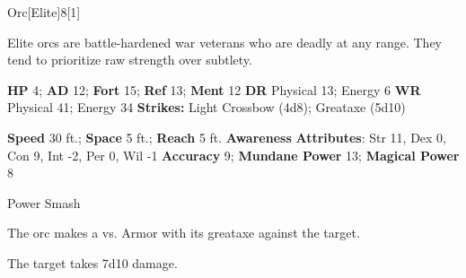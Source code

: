   \begin{monsection}{Orc}[Elite]{8}[1]
    \vspace{-1em}\vspace{-1em}
    \vspace{0em}

    
      Elite orcs are battle-hardened war veterans who are deadly at any range.
      They tend to prioritize raw strength over subtlety.
    

    \begin{spellcontent}
      \begin{spelltargetinginfo}
        \pari \textbf{HP} 4;
          \textbf{AD} 12;
          \textbf{Fort} 15;
          \textbf{Ref} 13;
          \textbf{Ment} 12
        \pari \textbf{DR} Physical 13; Energy 6
        \pari \textbf{WR} Physical 41; Energy 34
        \pari \textbf{Strikes:}
            Light Crossbow  (4d8); Greataxe  (5d10)
      \end{spelltargetinginfo}
    \end{spellcontent}
    \begin{monsterfooter}
      \pari \textbf{Speed} 30 ft.;
        \textbf{Space} 5 ft.;
        \textbf{Reach} 5 ft.
      \pari \textbf{Awareness} 
      \pari \textbf{Attributes}:
        Str 11, Dex 0,
        Con 9, Int -2,
        Per 0, Wil -1
      \pari \textbf{Accuracy} 9;
        \textbf{Mundane Power} 13;
      \textbf{Magical Power} 8
    \end{monsterfooter}
  \end{monsection}
  \begin{freeability}{Power Smash}
      
      The orc makes a 
         vs. Armor
        with its greataxe against the target.
    
    \hit The target takes 7d10  damage.
    \end{freeability}
  
